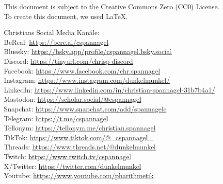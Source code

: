\documentclass[12pt,a4paper,oneside,ngerman]{article}
\begin{document}
\tiny{This document is subject to the Creative Commons Zero (CC0) License.
\\ To create this document, we used \LaTeX{}.

Christians Social Media Kanäle:\\
BeReal: \url{https://bere.al/cspannagel}\\
Bluesky: \url{https://bsky.app/profile/cspannagel.bsky.social}\\
Discord: \url{https://tinyurl.com/chrisp-discord}\\
Facebook: \url{https://www.facebook.com/chr.spannagel}\\
Instagram: \url{https://www.instagram.com/dunkelmunkel/}\\
LinkedIn: \url{https://www.linkedin.com/in/christian-spannagel-31b7b4a1/}\\
Mastodon: \url{https://scholar.social/@cspannagel}\\
Snapchat: \url{https://www.snapchat.com/add/spannagelc}\\
Telegram: \url{https://t.me/cspannagel}\\
Tellonym: \url{https://tellonym.me/christian.spannagel}\\
TikTok: \url{https://www.tiktok.com/@_cspannagel_}\\
Threads: \url{https://www.threads.net/@dunkelmunkel}\\
Twitch: \url{https://www.twitch.tv/cspannagel}\\
X/Twitter: \url{https://twitter.com/dunkelmunkel}\\
Youtube: \url{https://www.youtube.com/pharithmetik}}\\


\end{document}
